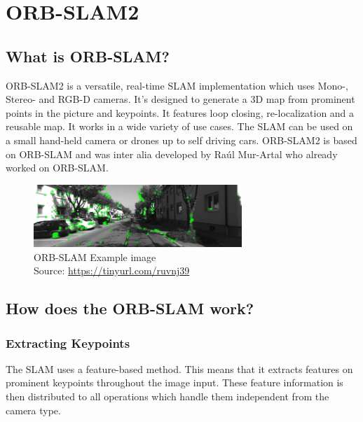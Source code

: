
\chapter{ORB-SLAM2\authorA}\label{ref:orbslam}

\section{What is ORB-SLAM?}
ORB-SLAM2 is a versatile, real-time SLAM implementation which uses Mono-, Stereo- and RGB-D cameras. It's designed to generate a 3D map from prominent points in the picture and keypoints. It features loop closing, re-localization and a reusable map.\cite{orbslam2} It works in a wide variety of use cases. The SLAM can be used on a small hand-held camera or drones up to self driving cars.
ORB-SLAM2 is based on ORB-SLAM and was inter alia developed by Raúl Mur-Artal who already worked on ORB-SLAM.\\

\begin{figure}[h]
	\centering
	\includegraphics[width=0.7\textwidth]{./media/images/orb-slam-kitti-dataset.png}
  	\caption{ORB-SLAM Example image
  	\\Source: \url{https://tinyurl.com/ruvnj39}}
  	\label{rosstructure}
\end{figure}

\section{How does the ORB-SLAM work?}

\subsection{Extracting Keypoints}
The SLAM uses a feature-based method. This means that it extracts features on prominent keypoints throughout the image input. These feature information is then distributed to all operations which handle them independent from the camera type. \cite{orbslam2} \newline\newline


